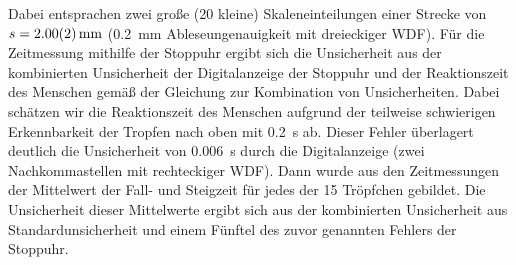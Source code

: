\documentclass[
	a4paper,
	12pt,
	pagesize,
	ngerman
]{scrartcl}
\begin{document}
	Dabei entsprachen zwei große (20 kleine) Skaleneinteilungen  einer Strecke von $s = \SI{2\pm 0,02}{mm}$ (\SI{0,2}{mm} Ableseungenauigkeit mit dreieckiger WDF).
	Für die Zeitmessung mithilfe der Stoppuhr ergibt sich die Unsicherheit aus der kombinierten Unsicherheit der Digitalanzeige der Stoppuhr und der Reaktionszeit des Menschen gemäß der Gleichung zur Kombination von Unsicherheiten. %
	Dabei schätzen wir die Reaktionszeit des Menschen aufgrund der teilweise schwierigen Erkennbarkeit der Tropfen nach oben mit \SI{0.2}{s} ab.
	Dieser Fehler überlagert deutlich die Unsicherheit von \SI{0.006}{s} durch die Digitalanzeige (zwei Nachkommastellen mit rechteckiger WDF).
	Dann wurde aus den Zeitmessungen der Mittelwert der Fall- und Steigzeit für jedes der 15 Tröpfchen gebildet.
	Die Unsicherheit dieser Mittelwerte ergibt sich aus der kombinierten Unsicherheit aus Standardunsicherheit und einem Fünftel des zuvor genannten Fehlers der Stoppuhr.
	
\end{document}
